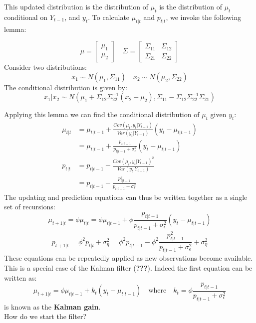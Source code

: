 \documentclass[DIV=14,titlepage=false]{scrreprt}
\begin{document}
This updated distribution is the distribution of $\mu_t$ is the distribution of $\mu_t$ conditional on $Y_{t-1}$, and $y_t$. To calculate $\mu_{t|t}$ and $p_{t|t}$, we invoke the following lemma:
\begin{lemma}
    \[
        \mu = \begin{bmatrix} \mu_1 \\ \mu_2 \end{bmatrix} \quad \Sigma = \begin{bmatrix} \Sigma_{11} & \Sigma_{12} \\ \Sigma_{21} & \Sigma_{22} \end{bmatrix}
    \]
    Consider two distributions:
    \[
        x_1 \sim N(\mu_1, \Sigma_{11}) \quad x_2 \sim N(\mu_2, \Sigma_{22})
    \]
    The conditional distribution is given by:
    \[
        x_1 | x_2 \sim N(\mu_1 + \Sigma_{12} \Sigma_{22}^{-1} (x_2 - \mu_2), \Sigma_{11} - \Sigma_{12} \Sigma_{22}^{-1} \Sigma_{21})
    \]
\end{lemma}
Applying this lemma we can find the conditional distribution of $\mu_t$ given $y_t$:
\begin{align*}
    \mu_{t|t} &= \mu_{t|t-1} + \frac{Cov(\mu_t, y_t | Y_{t-1})}{Var(y_t|Y_{t-1})} (y_t - \mu_{t|t-1})\\
    &= \mu_{t|t-1} + \frac{p_{t|t-1}}{p_{t|t-1} + \sigma^2_\epsilon} (y_t - \mu_{t|t-1})\\
    p_{t|t} &= p_{t|t-1} - \frac{Cov(\mu_t, y_t | Y_{t-1})^2}{Var(y_t|Y_{t-1})} \\
    &= p_{t|t-1} - \frac{p_{t|t-1}^2}{p_{t|t-1} + \sigma^2_\epsilon}
\end{align*}
The updating and prediction equations can thus be written together as a single set of recursions:
\[
    \mu_{t+1|t} = \phi \mu_{t|t} = \phi \mu_{t|t-1} + \phi \frac{p_{t|t-1}}{p_{t|t-1} + \sigma^2_\epsilon} (y_t - \mu_{t|t-1})
\]
\[
    p_{t+1|t} = \phi^2 p_{t|t} + \sigma^2_\eta = \phi^2 p_{t|t-1} - \phi^2 \frac{p_{t|t-1}^2}{p_{t|t-1} + \sigma^2_\epsilon} + \sigma^2_\eta
\]
These equations can be repeatedly applied as new observations become available. This is a special case of the Kalman filter (\textbf{???}). Indeed the first equation can be written as:
\[
    \mu_{t+1|t} = \phi \mu_{t|t-1} + k_t (y_t - \mu_{t|t-1}) \quad \text{where} \quad k_t = \phi \frac{p_{t|t-1}}{p_{t|t-1} + \sigma^2_\epsilon}
\]
is known as the \textbf{Kalman gain}. \\
How do we start the filter? \\
\end{document}
